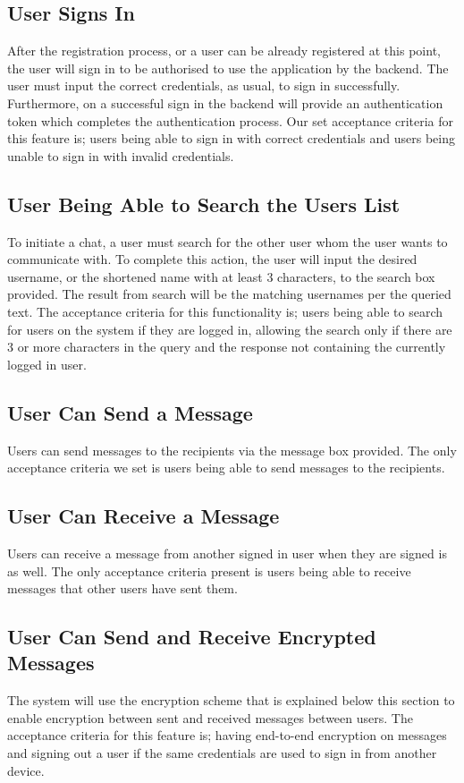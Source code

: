 \documentclass[11pt,a4paper]{report}
\begin{document}
\subsection{User Signs In}
After the registration process, or a user can be already registered at this point, the user will sign in to be authorised to use the application by the backend. The user must input the correct credentials, as usual, to sign in successfully. Furthermore, on a successful sign in the backend will provide an authentication token which completes the authentication process. Our set acceptance criteria for this feature is; users being able to sign in with correct credentials and users being unable to sign in with invalid credentials.
\subsection{User Being Able to Search the Users List}
To initiate a chat, a user must search for the other user whom the user wants to communicate with. To complete this action, the user will input the desired username, or the shortened name with at least 3 characters, to the search box provided. The result from search will be the matching usernames per the queried text. The acceptance criteria for this functionality is; users being able to search for users on the system if they are logged in, allowing the search only if there are 3 or more characters in the query and the response not containing the currently logged in user.
\subsection{User Can Send a Message}
Users can send messages to the recipients via the message box provided. The only acceptance criteria we set is users being able to send messages to the recipients.
\subsection{User Can Receive a Message}
Users can receive a message from another signed in user when they are signed is as well. The only acceptance criteria present is users being able to receive messages that other users have sent them.
\subsection{User Can Send and Receive Encrypted Messages}
The system will use the encryption scheme that is explained below this section to enable encryption between sent and received messages between users. The acceptance criteria for this feature is; having end-to-end encryption on messages and signing out a user if the same credentials are used to sign in from another device.
\end{document}
